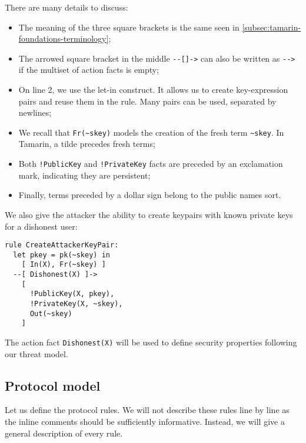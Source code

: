 There are many details to discuss:
\begin{itemize}
  \item The meaning of the three square brackets is the same seen in \cref{subsec:tamarin-foundations-terminology};
  \item The arrowed square bracket in the middle \lstinline{--[]->} can also be written as \lstinline{-->} if the multiset of action facts is empty;
  \item On line 2, we use the let-in construct. It allows us to create key-expression pairs and reuse them in the rule. Many pairs can be used, separated by newlines;
  \item We recall that \lstinline{Fr(~skey)} models the creation of the fresh term \lstinline{~skey}. In Tamarin, a tilde precedes fresh terms;
  \item Both \lstinline{!PublicKey} and \lstinline{!PrivateKey} facts are preceded by an exclamation mark, indicating they are persistent;
  \item Finally, terms preceded by a dollar sign belong to the public names sort.
\end{itemize}

We also give the attacker the ability to create keypairs with known private keys for a dishonest user:

\begin{lstlisting}
rule CreateAttackerKeyPair:
  let pkey = pk(~skey) in
    [ In(X), Fr(~skey) ]
  --[ Dishonest(X) ]->
    [
      !PublicKey(X, pkey),
      !PrivateKey(X, ~skey),
      Out(~skey)
    ]
\end{lstlisting}

The action fact \lstinline{Dishonest(X)} will be used to define security properties following our threat model.

\subsection{Protocol model}
Let us define the protocol rules. We will not describe these rules line by line as the inline comments should be sufficiently informative. Instead, we will give a general description of every rule.

